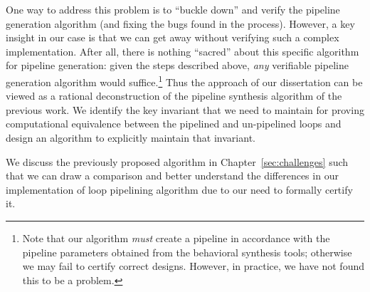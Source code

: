 One way to address this problem is to ``buckle down'' and
verify the pipeline generation algorithm (and fixing the
bugs found in the process).  However, a key insight in our
case is that we can get away without verifying such a
complex implementation.  After all, there is nothing
``sacred'' about this specific algorithm for pipeline
generation: given the steps described above, {\em any}
verifiable pipeline generation algorithm would
suffice.\footnote{Note that our algorithm {\em must} create
  a pipeline in accordance with the pipeline parameters
  obtained from the behavioral synthesis tools; otherwise we may
  fail to certify correct designs. However, in practice, we
  have not found this to be a problem.}  Thus the approach
of our dissertation can be viewed as a rational deconstruction of
the pipeline synthesis algorithm of the previous work.  We
identify the key invariant that we need to maintain for
proving computational equivalence between the pipelined and
un-pipelined loops and design an algorithm to explicitly
maintain that invariant.

We discuss the previously proposed algorithm in Chapter~\ref{sec:challenges}
such that we can draw a comparison and better understand the differences
in our implementation of loop pipelining algorithm due to our need to formally certify it.
